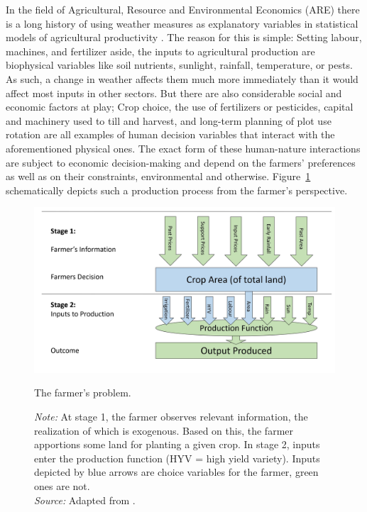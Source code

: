 \documentclass[a4paper,12pt]{article}
\theoremstyle{plain}
\theoremstyle{definition}
\theoremstyle{definition}
\theoremstyle{definition}
\theoremstyle{definition}
\begin{document}
In the field of Agricultural, Resource and Environmental Economics (ARE) there is a long history of using weather measures as explanatory variables in statistical models of agricultural productivity \citep[e.g.][]{Fisher1925}. The reason for this is simple: Setting labour, machines, and fertilizer aside, the inputs to agricultural production are biophysical variables like soil nutrients, sunlight, rainfall, temperature, or pests. As such, a change in weather affects them much more immediately than it would affect most inputs in other sectors. But there are also considerable social and economic factors at play; Crop choice, the use of fertilizers or pesticides, capital and machinery used to till and harvest, and long-term planning of plot use rotation are all examples of human decision variables that interact with the aforementioned physical ones. The exact form of these human-nature interactions are subject to economic decision-making and depend on the farmers’ preferences as well as on their constraints, environmental and otherwise.  Figure~\ref{fig:production_auffhammer} schematically depicts such a production process from the farmer's perspective.

\begin{figure}[t!]
    \centering
    \includegraphics[scale=0.5]{fig_production_auffhammer.JPG}
    \caption{The farmer's problem.}
    \caption*{\footnotesize{\textit{Note:} At stage 1, the farmer observes relevant information, the realization of which is exogenous. Based on this, the farmer apportions some land for planting a given crop. In stage 2, inputs enter the production function (HYV = high yield variety). Inputs depicted by blue arrows are choice variables for the farmer, green ones are not. \\ \textit{Source:} Adapted from \citet{Auffhammer2014b}.}}
    \label{fig:production_auffhammer}
\end{figure}
\end{document}
